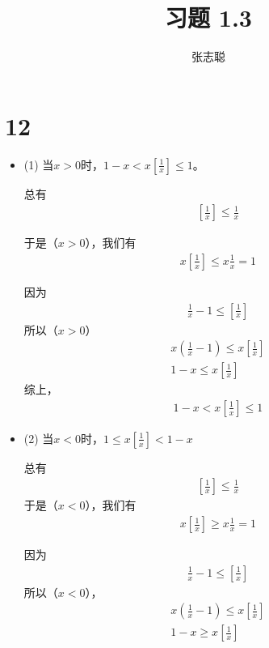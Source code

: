 \documentclass{article}
\begin{document}
\title{习题 1.3}
\author{张志聪}
\maketitle

\section*{12}

\begin{itemize}
  \item (1) 当$x > 0$时，$1 - x < x \left[\frac{1}{x}\right] \leq 1$。

        总有
        \begin{align*}
          \left[\frac{1}{x}\right] \leq \frac{1}{x}
        \end{align*}

        于是（$x > 0$），我们有
        \begin{align*}
          x \left[\frac{1}{x}\right] \leq x \frac{1}{x} = 1
        \end{align*}

        因为
        \begin{align*}
          \frac{1}{x} - 1 \leq \left[\frac{1}{x}\right]
        \end{align*}
        所以（$x > 0$）
        \begin{align*}
          x(\frac{1}{x} - 1) \leq x \left[\frac{1}{x}\right] \\
          1 - x \leq x \left[\frac{1}{x}\right]
        \end{align*}
        综上，
        \begin{align*}
          1 - x < x \left[\frac{1}{x}\right] \leq 1
        \end{align*}

  \item (2) 当$x < 0$时，$1 \leq x \left[\frac{1}{x}\right] < 1 - x$

        总有
        \begin{align*}
          \left[\frac{1}{x}\right] \leq \frac{1}{x}
        \end{align*}
        于是（$x < 0$），我们有
        \begin{align*}
          x \left[\frac{1}{x}\right] \geq x \frac{1}{x} = 1
        \end{align*}


        因为
        \begin{align*}
          \frac{1}{x} - 1 \leq \left[\frac{1}{x}\right]
        \end{align*}
        所以（$x < 0$），
        \begin{align*}
          x(\frac{1}{x} - 1) \leq x \left[\frac{1}{x}\right] \\
          1 - x \geq x \left[\frac{1}{x}\right]
        \end{align*}

\end{itemize}
\end{document}
